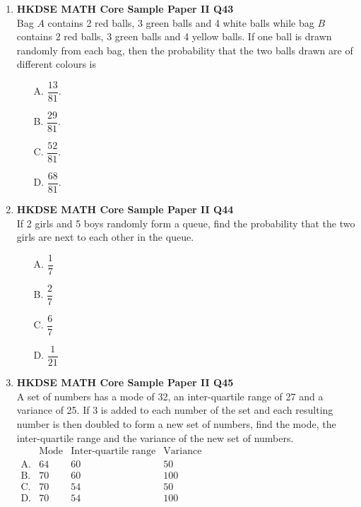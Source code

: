 \documentclass[12pt]{article}
\begin{document}
\begin{enumerate}
	\item \textbf{HKDSE MATH Core Sample Paper II Q43}\\
	Bag $A$ contains 2 red balls, 3 green balls and 4 white balls while bag $B$ contains 2 red balls, 3 green balls and 4 yellow balls. If one ball is drawn randomly from each bag, then the probability that the two balls drawn are of different colours is
	\begin{enumerate}
		\item[A.] $\dfrac{13}{81}$.
		\item[B.] $\dfrac{29}{81}$.
		\item[C.] $\dfrac{52}{81}$.
		\item[D.] $\dfrac{68}{81}$.
	\end{enumerate}
	
	\item \textbf{HKDSE MATH Core Sample Paper II Q44}\\
	If 2 girls and 5 boys randomly form a queue, find the probability that the two girls are next to each other in the queue.
	\begin{enumerate}
		\item[A.] $\dfrac{1}{7}$
		\item[B.] $\dfrac{2}{7}$
		\item[C.] $\dfrac{6}{7}$
		\item[D.] $\dfrac{1}{21}$
	\end{enumerate}
	
	\item \textbf{HKDSE MATH Core Sample Paper II Q45}\\
	A set of numbers has a mode of 32, an inter-quartile range of 27 and a variance of 25. If 3 is added to each number of the set and each resulting number is then doubled to form a new set of numbers, find the mode, the inter-quartile range and the variance of the new set of numbers.
	$\begin{matrix}
	&\text{Mode}&\text{Inter-quartile range}&\text{Variance}\\
	\text{A.}&64&60&50\\
	\text{B.}&70&60&100\\
	\text{C.}&70&54&50\\
	\text{D.}&70&54&100\\
	\end{matrix}$

\end{enumerate}
\end{document}
